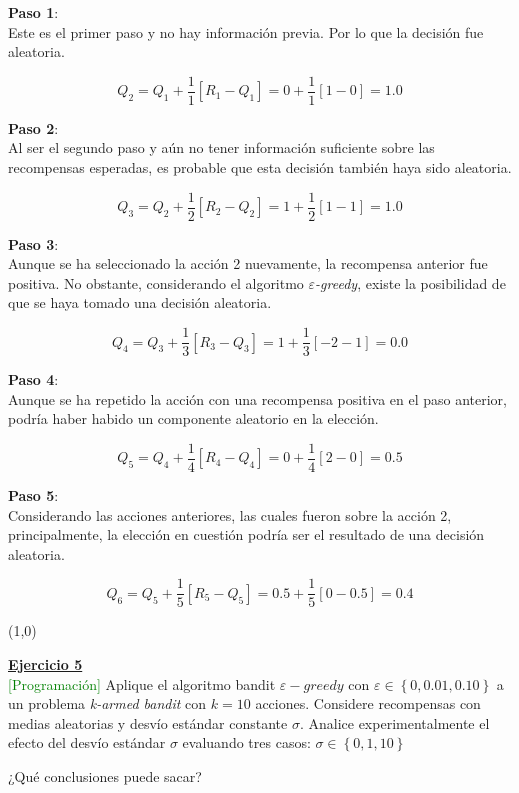 \documentclass[12pt]{article}
\newlength\tindent
\renewcommand{\indent}{\hspace*{\tindent}}
\begin{document}
    \textbf{Paso 1}:\\
    Este es el primer paso y no hay información previa.
    Por lo que la decisión fue aleatoria.

    \[
        Q_2 = Q_1 + \frac{1}{1} [R_1 - Q_1] = 0 + \frac{1}{1} [1 - 0] = 1.0
    \]

    \textbf{Paso 2}:\\
    Al ser el segundo paso y aún no tener información suficiente sobre las recompensas esperadas, es probable que esta decisión también haya sido aleatoria.

    \[
        Q_3 = Q_2 + \frac{1}{2} [R_2 - Q_2] = 1 + \frac{1}{2} [1 - 1] = 1.0
    \]

    \textbf{Paso 3}:\\
    Aunque se ha seleccionado la acción 2 nuevamente, la recompensa anterior fue positiva.
    No obstante, considerando el algoritmo \textit{$\varepsilon$-greedy}, existe la posibilidad de que se haya tomado una decisión aleatoria.

    \[
        Q_4 = Q_3 + \frac{1}{3} [R_3 - Q_3] = 1 + \frac{1}{3} [-2 - 1] = 0.0
    \]

    \textbf{Paso 4}:\\
    Aunque se ha repetido la acción con una recompensa positiva en el paso anterior, podría haber habido un componente aleatorio en la elección.

    \[
        Q_5 = Q_4 + \frac{1}{4} [R_4 - Q_4] = 0 + \frac{1}{4} [2 - 0] = 0.5
    \]

    \textbf{Paso 5}:\\
    Considerando las acciones anteriores, las cuales fueron sobre la acción 2, principalmente, la elección en cuestión podría ser el resultado de una decisión aleatoria.

    \[
        Q_6 = Q_5 + \frac{1}{5} [R_5 - Q_5] = 0.5 + \frac{1}{5} [0 - 0.5] = 0.4
    \]


    \line(1,0){\textwidth}

    \indent\underline{\textbf{Ejercicio 5}}\\
    \textcolor{green}{[Programación]} Aplique el algoritmo bandit $\varepsilon-greedy$ con $\varepsilon \in \left\{ 0, 0.01, 0.10 \right\}$ a un problema \textit{k-armed bandit} con $k=10$ acciones.
    Considere recompensas con medias aleatorias y desvío estándar constante $\sigma$.
    Analice experimentalmente el efecto del desvío estándar $\sigma$ evaluando tres casos: $\sigma \in \left\{ 0, 1, 10 \right\}$

    ¿Qué conclusiones puede sacar?
\end{document}
